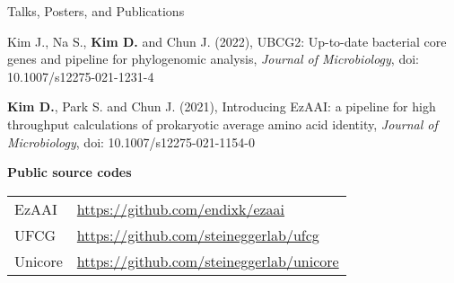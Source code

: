 \documentclass{resume} %
\begin{document}
\begin{rSection}{Talks, Posters, and Publications}
\begin{thebibliography}{10}
Kim J., Na S., {\bf Kim D.} and Chun J.  (2022), 
UBCG2: Up-to-date bacterial core genes and pipeline for phylogenomic analysis, {\em Journal of Microbiology}, doi: 10.1007/s12275-021-1231-4

{\bf Kim D.}, Park S. and Chun J. (2021),
Introducing EzAAI: a pipeline for high throughput calculations of prokaryotic average amino acid identity, {\em Journal of Microbiology}, doi: 10.1007/s12275-021-1154-0

\end{thebibliography}
\vspace{4mm}

{\bf Public source codes }\vspace{1mm} 

\begin{tabular}{p{2.5cm}p{14.1cm}}
EzAAI  & \url{https://github.com/endixk/ezaai} \\[1.mm]
UFCG  & \url{https://github.com/steineggerlab/ufcg} \\[1.mm]
Unicore &  \url{https://github.com/steineggerlab/unicore} \\[1.mm]
\end{tabular}
\vspace{1mm}

\end{rSection}
\end{document}
